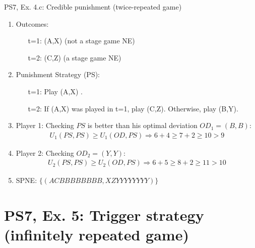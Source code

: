 \begin{frame}{PS7, Ex. 4.c: Credible punishment (twice-repeated game)}
\begin{multicols}{2}
\begin{enumerate}
      \item Outcomes:
      \begin{itemize}\normalsize
        \item[t=1:] (A,X) (not a stage game NE)
        \item[t=2:] (C,Z) (a stage game NE)
      \end{itemize}
      \item Punishment Strategy (PS):
      \begin{itemize}\normalsize
        \item[t=1:] Play (A,X) .
        \item[t=2:] If (A,X) was played in t=1, play (C,Z). Otherwise, play (B,Y).
      \end{itemize}
      \item Player 1: Checking $PS$ is better than his optimal deviation $OD_1=(B,B)$:
      \vspace{-6pt}
      \begin{align*}
        U_1(PS,PS)\geq U_1(OD,PS)\Rightarrow6+4\geq7+2\geq10>9
      \end{align*}
      \item \vspace{-4pt} Player 2: Checking $OD_2=(Y,Y)$:
      \vspace{-6pt}
      \begin{align*}
        U_2(PS,PS)\geq U_2(OD,PS)\Rightarrow6+5\geq8+2\geq11>10
      \end{align*}
      \item \vspace{-4pt} SPNE: $\{(ACBBBBBBBB,XZYYYYYYYY)\}$
    \end{enumerate}
    \vfill\null
  \end{multicols}
\end{frame}




\section{PS7, Ex. 5: Trigger strategy (infinitely repeated game)}

